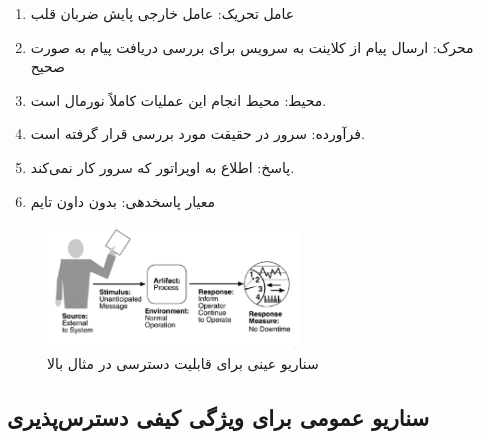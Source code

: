 \begin{enumerate}
    \item عامل تحریک: عامل خارجی پایش ضربان قلب
    \item محرک: ارسال پیام از کلاینت به سرویس برای بررسی دریافت پیام به صورت صحیح
    \item محیط: محیط انجام این عملیات کاملاً نورمال است.
    \item فرآورده: سرور در حقیقت مورد بررسی قرار گرفته است.
    \item پاسخ: اطلاع به اوپراتور که سرور کار نمی‌کند.
    \item معیار پاسخدهی: بدون داون تایم
\end{enumerate}

\begin{figure}[H]
    \centering
    \includegraphics[width=0.6\textwidth]{images/heartbeat-system-concrete-scenario.png}
    \caption{سناریو عینی برای قابلیت دسترسی در مثال بالا}
    \label{fig:heartbeatExampleConcreteScenrario}
\end{figure}

\subsection{سناریو عمومی برای ویژگی کیفی دسترس‌پذیری}

